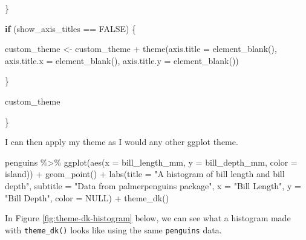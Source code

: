 \documentclass[
]{book}
\newenvironment{Shaded}{\begin{snugshade}}{\end{snugshade}}
\newcommand{\AttributeTok}[1]{\textcolor[rgb]{0.77,0.63,0.00}{#1}}
\newcommand{\ConstantTok}[1]{\textcolor[rgb]{0.00,0.00,0.00}{#1}}
\newcommand{\ControlFlowTok}[1]{\textcolor[rgb]{0.13,0.29,0.53}{\textbf{#1}}}
\newcommand{\FunctionTok}[1]{\textcolor[rgb]{0.00,0.00,0.00}{#1}}
\newcommand{\NormalTok}[1]{#1}
\newcommand{\OtherTok}[1]{\textcolor[rgb]{0.56,0.35,0.01}{#1}}
\newcommand{\SpecialCharTok}[1]{\textcolor[rgb]{0.00,0.00,0.00}{#1}}
\newcommand{\StringTok}[1]{\textcolor[rgb]{0.31,0.60,0.02}{#1}}
\begin{document}
\begin{Shaded}
\begin{Highlighting}[]
\NormalTok{  \}}
  
  \ControlFlowTok{if}\NormalTok{ (show\_axis\_titles }\SpecialCharTok{==} \ConstantTok{FALSE}\NormalTok{) \{}
    
\NormalTok{    custom\_theme }\OtherTok{\textless{}{-}}\NormalTok{ custom\_theme }\SpecialCharTok{+}
      \FunctionTok{theme}\NormalTok{(}\AttributeTok{axis.title =} \FunctionTok{element\_blank}\NormalTok{(),}
            \AttributeTok{axis.title.x =} \FunctionTok{element\_blank}\NormalTok{(),}
            \AttributeTok{axis.title.y =} \FunctionTok{element\_blank}\NormalTok{())}
    
\NormalTok{  \}}
  
\NormalTok{  custom\_theme}
  
\NormalTok{\}}
\end{Highlighting}
\end{Shaded}

I can then apply my theme as I would any other ggplot theme.

\begin{Shaded}
\begin{Highlighting}[]
\NormalTok{penguins }\SpecialCharTok{\%\textgreater{}\%} 
  \FunctionTok{ggplot}\NormalTok{(}\FunctionTok{aes}\NormalTok{(}\AttributeTok{x =}\NormalTok{ bill\_length\_mm,}
             \AttributeTok{y =}\NormalTok{ bill\_depth\_mm,}
             \AttributeTok{color =}\NormalTok{ island)) }\SpecialCharTok{+}
  \FunctionTok{geom\_point}\NormalTok{() }\SpecialCharTok{+}
  \FunctionTok{labs}\NormalTok{(}\AttributeTok{title =} \StringTok{"A histogram of bill length and bill depth"}\NormalTok{,}
       \AttributeTok{subtitle =} \StringTok{"Data from palmerpenguins package"}\NormalTok{,}
       \AttributeTok{x =} \StringTok{"Bill Length"}\NormalTok{,}
       \AttributeTok{y =} \StringTok{"Bill Depth"}\NormalTok{,}
       \AttributeTok{color =} \ConstantTok{NULL}\NormalTok{) }\SpecialCharTok{+}
  \FunctionTok{theme\_dk}\NormalTok{()}
\end{Highlighting}
\end{Shaded}

In Figure \ref{fig:theme-dk-histogram} below, we can see what a histogram made with \texttt{theme\_dk()} looks like using the same \texttt{penguins} data.
\end{document}
